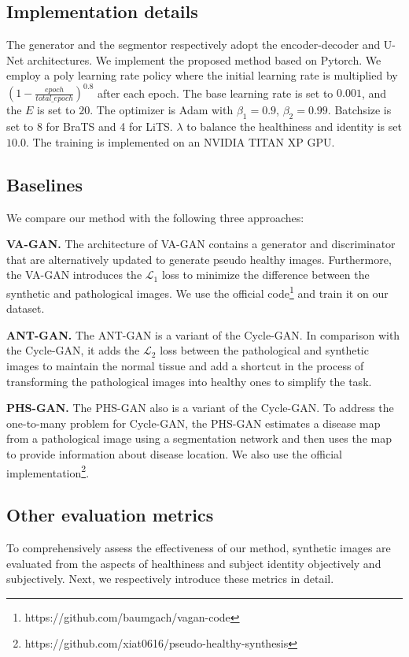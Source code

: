 \documentclass[journal,twoside,web]{ieeecolor}
\begin{document}
\subsection{Implementation details}
The generator and the segmentor respectively adopt the encoder-decoder \cite{Johnson2016PerceptualLF}  and U-Net \cite{ronneberger2015u} architectures. We implement the proposed method based on Pytorch. We employ a poly learning rate policy where the initial learning rate is multiplied by $(1-\frac{epoch}{total\_epoch})^{0.8}$ after each epoch. The base learning rate is set to $0.001$, and the $E$ is set to $20$. The optimizer is Adam with $\beta_1 = 0.9$, $\beta_2 = 0.99$. Batchsize is set to 8 for BraTS and 4 for LiTS. $\lambda$ to balance the healthiness and identity is set $10.0$.  The training is implemented on an NVIDIA TITAN XP GPU.

\subsection{Baselines}
We compare our method with the following three approaches:

\noindent\textbf{VA-GAN.} The architecture of VA-GAN \cite{baumgartner2018visual} contains a generator and discriminator that are alternatively updated to generate pseudo healthy images. Furthermore, the VA-GAN introduces the $\mathcal{L}_1$ loss to minimize the difference between the synthetic and pathological images. We use the official code\footnote{https://github.com/baumgach/vagan-code
} and train it on our dataset.

\noindent\textbf{ANT-GAN.}  The ANT-GAN \cite{sun2020adversarial} is a variant of the Cycle-GAN. In comparison with the Cycle-GAN, it adds the $\mathcal{L}_2$ loss between the pathological and synthetic images to maintain the normal tissue and add a shortcut in the process of transforming the pathological images into healthy ones to simplify the task.

\noindent\textbf{PHS-GAN.} The PHS-GAN \cite{sun2020adversarial} also is a variant of the Cycle-GAN. To address the one-to-many problem for Cycle-GAN, the PHS-GAN estimates a disease map from a pathological image using a segmentation network and then uses the map to provide information about disease location. We also use the official implementation\footnote{https://github.com/xiat0616/pseudo-healthy-synthesis}.

\subsection{Other evaluation metrics}
To comprehensively assess the effectiveness of our method, synthetic images are evaluated from the aspects of healthiness and subject identity objectively and subjectively. Next, we respectively introduce these metrics in detail.
\end{document}
